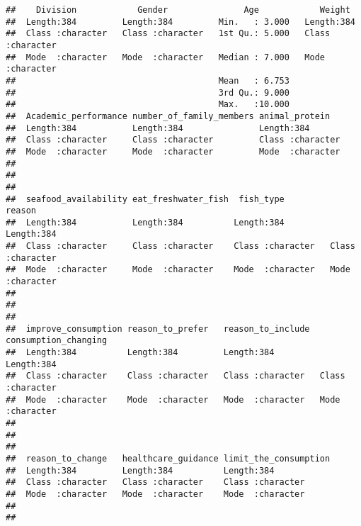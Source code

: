 \documentclass[
]{article}
\begin{document}
\begin{verbatim}
##    Division            Gender               Age            Weight         
##  Length:384         Length:384         Min.   : 3.000   Length:384        
##  Class :character   Class :character   1st Qu.: 5.000   Class :character  
##  Mode  :character   Mode  :character   Median : 7.000   Mode  :character  
##                                        Mean   : 6.753                     
##                                        3rd Qu.: 9.000                     
##                                        Max.   :10.000                     
##  Academic_performance number_of_family_members animal_protein    
##  Length:384           Length:384               Length:384        
##  Class :character     Class :character         Class :character  
##  Mode  :character     Mode  :character         Mode  :character  
##                                                                  
##                                                                  
##                                                                  
##  seafood_availability eat_freshwater_fish  fish_type            reason         
##  Length:384           Length:384          Length:384         Length:384        
##  Class :character     Class :character    Class :character   Class :character  
##  Mode  :character     Mode  :character    Mode  :character   Mode  :character  
##                                                                                
##                                                                                
##                                                                                
##  improve_consumption reason_to_prefer   reason_to_include  consumption_changing
##  Length:384          Length:384         Length:384         Length:384          
##  Class :character    Class :character   Class :character   Class :character    
##  Mode  :character    Mode  :character   Mode  :character   Mode  :character    
##                                                                                
##                                                                                
##                                                                                
##  reason_to_change   healthcare_guidance limit_the_consumption
##  Length:384         Length:384          Length:384           
##  Class :character   Class :character    Class :character     
##  Mode  :character   Mode  :character    Mode  :character     
##                                                              
##                                                              

\end{verbatim}
\end{document}
